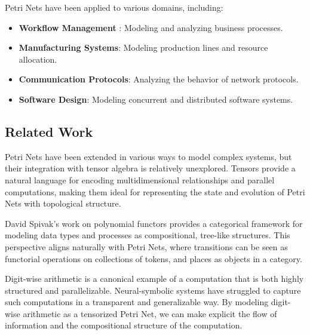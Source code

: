 Petri Nets have been applied to various domains, including:

\begin{itemize}
    \item \textbf{Workflow Management} \cite{van2000workflow}: Modeling and analyzing business processes.
    \item \textbf{Manufacturing Systems}: Modeling production lines and resource allocation.
    \item \textbf{Communication Protocols}: Analyzing the behavior of network protocols.
    \item \textbf{Software Design}: Modeling concurrent and distributed software systems.
\end{itemize}

\subsection{Related Work}

Petri Nets have been extended in various ways to model complex systems, but their integration with tensor algebra is relatively unexplored. Tensors provide a natural language for encoding multidimensional relationships and parallel computations, making them ideal for representing the state and evolution of Petri Nets with topological structure.

David Spivak’s work on polynomial functors provides a categorical framework for modeling data types and processes as compositional, tree-like structures. This perspective aligns naturally with Petri Nets, where transitions can be seen as functorial operations on collections of tokens, and places as objects in a category.

Digit-wise arithmetic is a canonical example of a computation that is both highly structured and parallelizable. Neural-symbolic systems have struggled to capture such computations in a transparent and generalizable way. By modeling digit-wise arithmetic as a tensorized Petri Net, we can make explicit the flow of information and the compositional structure of the computation.